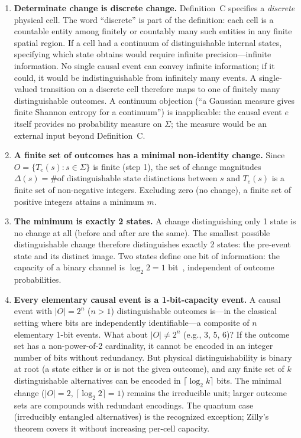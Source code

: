 \documentclass[aps,prd,twocolumn,showpacs,superscriptaddress,preprintnumbers]{revtex4-2}
\begin{document}
\begin{enumerate}
    \item \textbf{Determinate change is discrete change.} Definition~C specifies a \emph{discrete} physical cell. The word ``discrete'' is part of the definition: each cell is a countable entity among finitely or countably many such entities in any finite spatial region. If a cell had a continuum of distinguishable internal states, specifying which state obtains would require infinite precision---infinite information. No single causal event can convey infinite information; if it could, it would be indistinguishable from infinitely many events. A single-valued transition on a discrete cell therefore maps to one of finitely many distinguishable outcomes. A continuum objection (``a Gaussian measure gives finite Shannon entropy for a continuum'') is inapplicable: the causal event $e$ itself provides no probability measure on $\Sigma$; the measure would be an external input beyond Definition~C.

    \item \textbf{A finite set of outcomes has a minimal non-identity change.} Since $O = \{T_e(s) : s \in \Sigma\}$ is finite (step 1), the set of change magnitudes $\Delta(s) = \text{\# of distinguishable state distinctions between } s \text{ and } T_e(s)$ is a finite set of non-negative integers. Excluding zero (no change), a finite set of positive integers attains a minimum $m$.

    \item \textbf{The minimum is exactly 2 states.} A change distinguishing only 1 state is no change at all (before and after are the same). The smallest possible distinguishable change therefore distinguishes exactly 2 states: the pre-event state and its distinct image. Two states define one bit of information: the capacity of a binary channel is $\log_2 2 = 1$ bit~\cite{Shannon1948}, independent of outcome probabilities.

    \item \textbf{Every elementary causal event is a 1-bit-capacity event.} A causal event with $|O| = 2^n$ ($n > 1$) distinguishable outcomes is---in the classical setting where bits are independently identifiable---a composite of $n$ elementary 1-bit events. What about $|O| \neq 2^n$ (e.g., 3, 5, 6)? If the outcome set has a non-power-of-2 cardinality, it cannot be encoded in an integer number of bits without redundancy. But physical distinguishability is binary at root (a state either is or is not the given outcome), and any finite set of $k$ distinguishable alternatives can be encoded in $\lceil\log_2 k\rceil$ bits. The minimal change ($|O|=2$, $\lceil\log_2 2\rceil = 1$) remains the irreducible unit; larger outcome sets are compounds with redundant encodings. The quantum case (irreducibly entangled alternatives) is the recognized exception; Zilly's theorem covers it without increasing per-cell capacity.
\end{enumerate}
\end{document}
